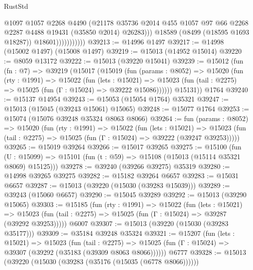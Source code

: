 \begin{lexlean}{RustStd}
\begin{coremodule}
                              @1097
                              @1057
                              @2268
                              @4490
                              (@21178
                                @35736
                                @2014
                                @455
                                @1057
                                @97
                                @66
                                @2268
                                @2287
                                @4488
                                @19431
                                (@35850 @2014)
                                @26283)))
                          @18589
                          (@8499 (@18595 @1693 @18287))
                          @18601)))))))))))
@39213 := @14996 @1497
@39217 := @14998 (@15002 @1497) (@15008 @1497)
@39219 := @15013 (@14952 @15014)
@39220 := @8059 @13172
@39222 := @15013 (@39220 @15041)
@39239 := @15012
    (fun (fn : @7) =>
    @39219
      (@15017
        (@15019
          (fun (params : @8052) =>
          @15020
            (fun (rty : @1991) =>
            @15022
              (fun (lets : @15021) =>
              @15023 (fun (tail : @2275) => @15025 (fun (Γ : @15024) => @39222 @15086))))))
        @15131))
    @1764
@39240 := @15137 @14954
@39243 := @15053 (@15054 @1764) @35321
@39247 := @15013 (@15045 (@39243 @15061) @15065)
@39248 := @15077 @1764
@39253 := @15074 (@15076 @39248 @35324 @8063 @8066)
@39264 := fun (params : @8052) =>
  @15020
    (fun (rty : @1991) =>
    @15022
      (fun (lets : @15021) =>
      @15023 (fun (tail : @2275) => @15025 (fun (Γ : @15024) => @39222 (@39247 @39253)))))
@39265 := @15019 @39264
@39266 := @15017 @39265
@39275 := @15100
    (fun (U : @15099) => @15101 (fun (t : @59) => @15108 (@15013 (@15114 @35321 @8069) @15125)))
@39278 := @39240 (@39266 @39275) @35319
@39280 := @14998 @39265 @39275
@39282 := @15182 @39264 @6657
@39283 := @15031 @6657
@39287 := @15013 (@39220 (@15030 (@39283 @15039)))
@39289 := @39243 (@15060 @6657)
@39290 := @15045 @39289
@39292 := @15013 (@39290 @15065)
@39303 := @15185
    (fun (rty : @1991) =>
    @15022
      (fun (lets : @15021) =>
      @15023 (fun (tail : @2275) => @15025 (fun (Γ : @15024) => @39287 (@39292 @39253)))))
    @6007
@39307 := @15013 (@39220 (@15030 (@39283 @35177)))
@39309 := @35184 @39248 @35324
@39321 := @15207
    (fun (lets : @15021) =>
    @15023
      (fun (tail : @2275) =>
      @15025 (fun (Γ : @15024) => @39307 (@39292 (@35183 (@39309 @8063 @8066))))))
    @6777
@39328 := @15013 (@39220 (@15030 (@39283 (@35176 (@15035 (@6778 @8066))))))

\end{coremodule}
\end{lexlean}
